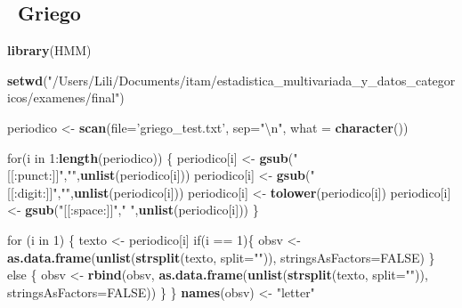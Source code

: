\documentclass[]{article}
\newenvironment{Shaded}{\begin{snugshade}}{\end{snugshade}}
\newcommand{\KeywordTok}[1]{\textcolor[rgb]{0.13,0.29,0.53}{\textbf{{#1}}}}
\newcommand{\DataTypeTok}[1]{\textcolor[rgb]{0.13,0.29,0.53}{{#1}}}
\newcommand{\DecValTok}[1]{\textcolor[rgb]{0.00,0.00,0.81}{{#1}}}
\newcommand{\CharTok}[1]{\textcolor[rgb]{0.31,0.60,0.02}{{#1}}}
\newcommand{\StringTok}[1]{\textcolor[rgb]{0.31,0.60,0.02}{{#1}}}
\newcommand{\OtherTok}[1]{\textcolor[rgb]{0.56,0.35,0.01}{{#1}}}
\newcommand{\NormalTok}[1]{{#1}}
\begin{document}
\subsection{~Griego}\label{griego}

\begin{Shaded}
\begin{Highlighting}[]
\KeywordTok{library}\NormalTok{(HMM)}

\KeywordTok{setwd}\NormalTok{(}\StringTok{"/Users/Lili/Documents/itam/estadistica_multivariada_y_datos_categoricos/examenes/final"}\NormalTok{)}


\NormalTok{periodico <-}\StringTok{ }\KeywordTok{scan}\NormalTok{(}\DataTypeTok{file=}\StringTok{'griego_test.txt'}\NormalTok{, }\DataTypeTok{sep=}\StringTok{"}\CharTok{\textbackslash{}n}\StringTok{"}\NormalTok{, }\DataTypeTok{what =} \KeywordTok{character}\NormalTok{())}



\NormalTok{for(i in }\DecValTok{1}\NormalTok{:}\KeywordTok{length}\NormalTok{(periodico)) \{}
  \NormalTok{periodico[i] <-}\StringTok{ }\KeywordTok{gsub}\NormalTok{(}\StringTok{"[[:punct:]]"}\NormalTok{,}\StringTok{""}\NormalTok{,}\KeywordTok{unlist}\NormalTok{(periodico[i]))}
  \NormalTok{periodico[i] <-}\StringTok{ }\KeywordTok{gsub}\NormalTok{(}\StringTok{"[[:digit:]]"}\NormalTok{,}\StringTok{""}\NormalTok{,}\KeywordTok{unlist}\NormalTok{(periodico[i]))}
  \NormalTok{periodico[i] <-}\StringTok{ }\KeywordTok{tolower}\NormalTok{(periodico[i])}
  \NormalTok{periodico[i] <-}\StringTok{ }\KeywordTok{gsub}\NormalTok{(}\StringTok{"[[:space:]]"}\NormalTok{,}\StringTok{" "}\NormalTok{,}\KeywordTok{unlist}\NormalTok{(periodico[i]))}
\NormalTok{\}}



\NormalTok{for (i in }\DecValTok{1}\NormalTok{) \{}
  \NormalTok{texto <-}\StringTok{ }\NormalTok{periodico[i]}
  \NormalTok{if(i ==}\StringTok{ }\DecValTok{1}\NormalTok{)\{}
    \NormalTok{obsv <-}\StringTok{ }\KeywordTok{as.data.frame}\NormalTok{(}\KeywordTok{unlist}\NormalTok{(}\KeywordTok{strsplit}\NormalTok{(texto, }\DataTypeTok{split=}\StringTok{""}\NormalTok{)), }\DataTypeTok{stringsAsFactors=}\OtherTok{FALSE}\NormalTok{)}
  \NormalTok{\} else \{}
    \NormalTok{obsv <-}\StringTok{ }\KeywordTok{rbind}\NormalTok{(obsv, }\KeywordTok{as.data.frame}\NormalTok{(}\KeywordTok{unlist}\NormalTok{(}\KeywordTok{strsplit}\NormalTok{(texto, }\DataTypeTok{split=}\StringTok{""}\NormalTok{)), }\DataTypeTok{stringsAsFactors=}\OtherTok{FALSE}\NormalTok{))}
  \NormalTok{\}}
\NormalTok{\}}
\KeywordTok{names}\NormalTok{(obsv) <-}\StringTok{ "letter"}


\end{Highlighting}
\end{Shaded}
\end{document}
